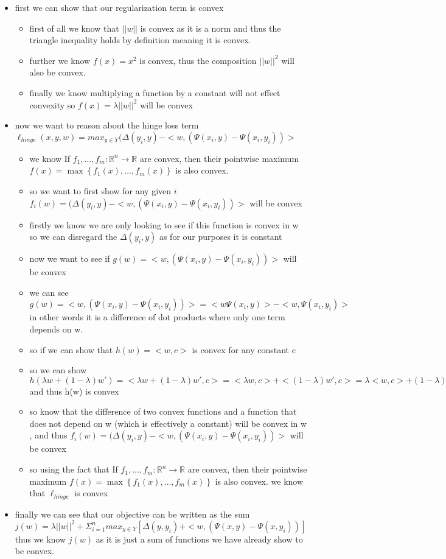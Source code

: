\documentclass{article}
\theoremstyle{plain}
\theoremstyle{definition}
\begin{document}
\begin{enumerate}
\begin{itemize}
   \color{blue}
    \item first we can show that our regularization term is convex 
    \begin{itemize}
    \item first of all we know that $||w||$ is convex as it is a norm and thus the triangle inequality holds by definition meaning it is convex.
    \item further we know $f(x)=x^2$ is convex, thus the composition $||w||^2$ will also be convex. 
    \item finally we know multiplying a function by a constant will not effect convexity so $f(x)=\lambda||w||^2$ will be convex
    \end{itemize}
    \item now we want to reason about the hinge loss term $\ell_{hinge}(x,y,w)=max_{y\in Y}(\Delta(y_i,y)-<w,(\Psi(x_i,y)- \Psi(x_i,y_i))>$
    \begin{itemize}
        \item we know If $f_{1},\ldots,f_{m}:\mathbb{R}^{n}\to\mathbb{R}$
are convex, then their pointwise maximum $f(x)=\max\left\{ f_{1}(x),\ldots,f_{m}(x)\right\} $
is also convex. 
\item so we want to first show for any given $i$ $f_{i}(w)=(\Delta(y_i,y)-<w,(\Psi(x_i,y)- \Psi(x_i,y_i))>$ will be convex 
\item firstly we know we are only looking to see if this function is convex in w so we can disregard the $\Delta(y_i,y)$ as for our purposes it is constant
\item now we want to see if $g(w)=<w,(\Psi(x_i,y)- \Psi(x_i,y_i))>$ will be convex
\item we can see  $g(w)=<w,(\Psi(x_i,y)- \Psi(x_i,y_i))>=<w\Psi(x_i,y)>-<w,\Psi(x_i,y_i)>$ in other words it is a difference  of dot products where only one term depends on w.
\item so if we can show that $h(w)=<w,c>$ is convex for any constant c
\item so we can show $h(\lambda w+(1-\lambda) w')=<\lambda w+(1-\lambda) w',c>=<\lambda w,c>+<(1-\lambda) w',c>=\lambda< w,c>+(1-\lambda) <w',c>=\lambda h(w)+(1-\lambda)h(w')$ and thus h(w) is convex 
\item so know that the difference of two convex functions and a function that does not depend on w (which is effectively a constant) will be convex in w , and thus $f_{i}(w)=(\Delta(y_i,y)-<w,(\Psi(x_i,y)- \Psi(x_i,y_i))>$ will be convex 
\item so using the fact that If $f_{1},\ldots,f_{m}:\mathbb{R}^{n}\to\mathbb{R}$
are convex, then their pointwise maximum $f(x)=\max\left\{ f_{1}(x),\ldots,f_{m}(x)\right\} $
is also convex. we know that $\ell_{hinge}$ is convex
    \end{itemize}
\item finally we can see that our objective can be written as the sum $j(w)=\lambda ||w||^2+\Sigma_{i=1}^{n}max_{y\in Y}[\Delta(y,y_i)+<w,(\Psi(x,y)-\Psi(x,y_i))]$ thus we know $j(w)$ as it is just a sum of functions we have already show to be convex. 
\end{itemize}



\end{enumerate}
\end{document}
